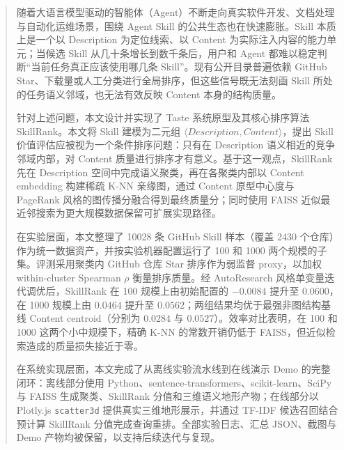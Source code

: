 

\begin{abstract}
  随着大语言模型驱动的智能体（Agent）不断走向真实软件开发、文档处理与自动化运维场景，围绕 Agent Skill 的公共生态也在快速膨胀。Skill 本质上是一个以 Description 为定位线索、以 Content 为实际注入内容的能力单元；当候选 Skill 从几十条增长到数千条后，用户和 Agent 都难以稳定判断“当前任务真正应该使用哪几条 Skill”。现有公开目录普遍依赖 GitHub Star、下载量或人工分类进行全局排序，但这些信号既无法刻画 Skill 所处的任务语义邻域，也无法有效反映 Content 本身的结构质量。

  针对上述问题，本文设计并实现了 Taste 系统原型及其核心排序算法 SkillRank。本文将 Skill 建模为二元组 $\langle Description, Content \rangle$，提出 Skill 价值评估应被视为一个条件排序问题：只有在 Description 语义相近的竞争邻域内部，对 Content 质量进行排序才有意义。基于这一观点，SkillRank 先在 Description 空间中完成语义聚类，再在各聚类内部以 Content embedding 构建稀疏 K-NN 亲缘图，通过 Content 原型中心度与 PageRank 风格的图传播分融合得到最终质量分；同时使用 FAISS 近似最近邻搜索为更大规模数据保留可扩展实现路径。

  在实验层面，本文整理了 10028 条 GitHub Skill 样本（覆盖 2430 个仓库）作为统一数据资产，并按实验机器配置运行了 100 和 1000 两个规模的子集。评测采用聚类内 GitHub 仓库 Star 排序作为弱监督 proxy，以加权 within-cluster Spearman $\rho$ 衡量排序质量。经 AutoResearch 风格单变量迭代调优后，SkillRank 在 100 规模上由初始配置的 $-0.0084$ 提升至 $0.0600$，在 1000 规模上由 $0.0464$ 提升至 $0.0562$；两组结果均优于最强非图结构基线 Content centroid（分别为 $0.0284$ 与 $0.0527$）。效率对比表明，在 100 和 1000 这两个小中规模下，精确 K-NN 的常数开销仍低于 FAISS，但近似检索造成的质量损失接近于零。

  在系统实现层面，本文完成了从离线实验流水线到在线演示 Demo 的完整闭环：离线部分使用 Python、sentence-transformers、scikit-learn、SciPy 与 FAISS 生成聚类、SkillRank 分值和三维语义地形产物；在线部分以 Plotly.js \texttt{scatter3d} 提供真实三维地形展示，并通过 TF-IDF 候选召回结合预计算 SkillRank 分值完成查询重排。全部实验日志、汇总 JSON、截图与 Demo 产物均被保留，以支持后续迭代与复现。
\end{abstract}


